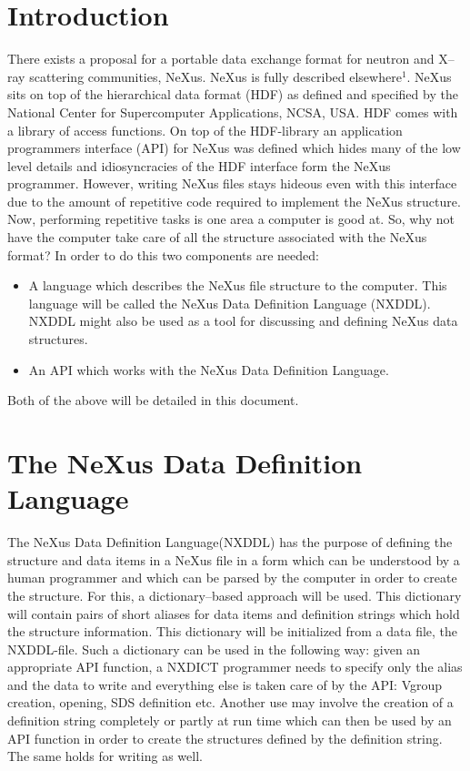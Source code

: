 \documentclass[12pt]{article}
\begin{document}
\section{Introduction}
 There exists a proposal for a portable data exchange format for neutron and
 X--ray scattering communities, NeXus. NeXus is fully described
 elsewhere$^{1}$. NeXus sits on top of the hierarchical data format (HDF) as
 defined and specified by the National Center for Supercomputer Applications, 
 NCSA, USA. HDF comes with a library of access functions. On top of the
 HDF-library an application programmers interface (API) for NeXus was
 defined which hides many of the low level details and idiosyncracies of
 the HDF interface form the NeXus programmer. However, writing NeXus files stays
 hideous even with this interface due to the amount of repetitive code
 required to implement the NeXus structure. Now, performing repetitive tasks is one
 area a computer is good at. So, why not have the computer take care of all
 the structure associated with the NeXus format? In order to do this two
 components are needed:
\begin{itemize}
\item A language which describes the NeXus file structure to the computer.
  This language will be called the NeXus Data Definition Language (NXDDL).
  NXDDL might also be used as a tool for discussing and defining NeXus
  data structures.
\item An API which works with the NeXus Data Definition Language.
\end{itemize}
Both of the above will be detailed in this document.

\section{The NeXus Data Definition Language}
The NeXus Data Definition Language(NXDDL) has the purpose of defining the structure
and data items in a NeXus file in a form which can be understood by a human
programmer and which can be parsed by the computer in order to create the 
structure. 
For this, a dictionary--based approach will be used. This dictionary
will contain pairs of short aliases for data items and definition strings 
which hold the structure information. This dictionary will
be initialized from a data file, the NXDDL-file. Such a dictionary can be
used in the following way: given an appropriate API function, a NXDICT
programmer  needs to specify only the alias and the data to write and 
everything else is taken care of by the API: Vgroup creation, opening,
SDS definition etc. Another use may involve the creation of a definition string
completely or partly at run time which can then be used by an API function
in order to create the structures defined by the definition string. The same
holds for writing as well.
\end{document}
